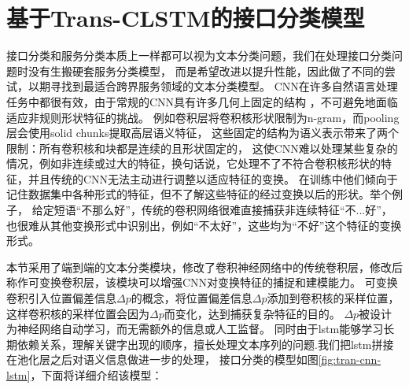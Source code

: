 \section{基于Trans-CLSTM的接口分类模型}
接口分类和服务分类本质上一样都可以视为文本分类问题，我们在处理接口分类问题时没有生搬硬套服务分类模型，
而是希望改进以提升性能，因此做了不同的尝试，以期寻找到最适合跨界服务领域的文本分类模型。
CNN在许多自然语言处理任务中都很有效，由于常规的CNN具有许多几何上固定的结构 ，不可避免地面临适应非规则形状特征的挑战。
例如卷积层将卷积核形状限制为n-gram，而pooling层会使用solid chunks提取高层语义特征，
这些固定的结构为语义表示带来了两个限制：所有卷积核和块都是连续的且形状固定的，
这使CNN难以处理某些复杂的情况，例如非连续或过大的特征，换句话说，它处理不了不符合卷积核形状的特征，并且传统的CNN无法主动进行调整以适应特征的变换。
在训练中他们倾向于记住数据集中各种形式的特征，但不了解这些特征的经过变换以后的形状。举个例子，
给定短语“不那么好”，传统的卷积网络很难直接捕获非连续特征“不...好”，也很难从其他变换形式中识别出，例如“不太好”，这些均为“不好”这个特征的变换形式。

本节采用了端到端的文本分类模块，修改了卷积神经网络中的传统卷积层，修改后称作可变换卷积层，该模块可以增强CNN对变换特征的捕捉和建模能力。
可变换卷积引入位置偏差信息$\Delta p$的概念，将位置偏差信息$\Delta p$添加到卷积核的采样位置，
这样卷积核的采样位置会因为$\Delta p$而变化，达到捕获复杂特征的目的。
$\Delta p$被设计为神经网络自动学习，而无需额外的信息或人工监督。
同时由于lstm能够学习长期依赖关系，理解关键字出现的顺序，擅长处理文本序列的问题.我们把lstm拼接在池化层之后对语义信息做进一步的处理，
接口分类的模型如图\ref{fig:tran-cnn-lstm}，下面将详细介绍该模型：

